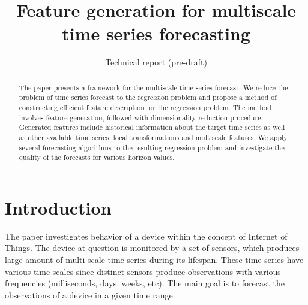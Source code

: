 \documentclass[conference]{IEEEtran}
\begin{document}
\title{Feature generation for multiscale time series forecasting}



\date{Technical report (pre-draft)}
\maketitle

\begin{abstract}
The paper presents a framework for the multiscale time series forecast. We reduce the problem of time series forecast to the regression problem and propose a method of constructing efficient feature description for the regression problem.
The method involves feature generation, followed with dimensionality reduction procedure. Generated features include historical information about the target time series as well as other available time series, local transformations and  multiscale features. We apply several forecasting algorithms to the resulting regression problem and investigate the quality of the forecasts for various horizon values.
\end{abstract}



\section{Introduction}
The paper investigates behavior of a device within the concept of Internet of Things. The device at question is monitored by a set of sensors, which produces large amount of multi-scale time series during its lifespan. These time series have various time scales since distinct sensors produce observations with various frequencies (milliseconds, days, weeks, etc).  The main goal is to forecast the observations of a device in a given time range.
\end{document}
